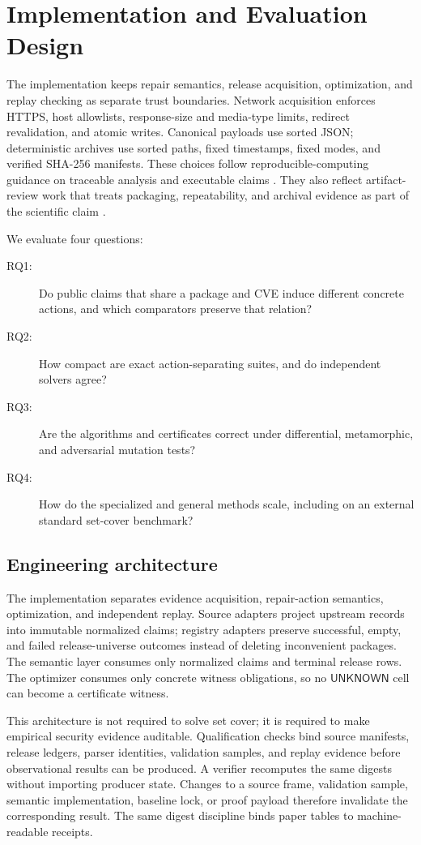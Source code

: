 \documentclass[10pt,conference]{IEEEtran}
\newcommand{\unknown}{\ensuremath{\mathsf{UNKNOWN}}}
\begin{document}
\section{Implementation and Evaluation Design}
The implementation keeps repair semantics, release acquisition, optimization, and replay checking as separate trust boundaries. Network acquisition enforces HTTPS, host allowlists, response-size and media-type limits, redirect revalidation, and atomic writes. Canonical payloads use sorted JSON; deterministic archives use sorted paths, fixed timestamps, fixed modes, and verified SHA-256 manifests. These choices follow reproducible-computing guidance on traceable analysis and executable claims \cite{peng2011reproducible,sandve2013ten,wilson2014best}. They also reflect artifact-review work that treats packaging, repeatability, and archival evidence as part of the scientific claim \cite{collberg2016repeatability,krishnamurthi2015artifact,ferro2018badging}.

We evaluate four questions:
\begin{description}
\item[RQ1:] Do public claims that share a package and CVE induce different concrete actions, and which comparators preserve that relation?
\item[RQ2:] How compact are exact action-separating suites, and do independent solvers agree?
\item[RQ3:] Are the algorithms and certificates correct under differential, metamorphic, and adversarial mutation tests?
\item[RQ4:] How do the specialized and general methods scale, including on an external standard set-cover benchmark?
\end{description}


\subsection{Engineering architecture}
The implementation separates evidence acquisition, repair-action semantics, optimization, and independent replay. Source adapters project upstream records into immutable normalized claims; registry adapters preserve successful, empty, and failed release-universe outcomes instead of deleting inconvenient packages. The semantic layer consumes only normalized claims and terminal release rows. The optimizer consumes only concrete witness obligations, so no \unknown{} cell can become a certificate witness.

This architecture is not required to solve set cover; it is required to make empirical security evidence auditable. Qualification checks bind source manifests, release ledgers, parser identities, validation samples, and replay evidence before observational results can be produced. A verifier recomputes the same digests without importing producer state. Changes to a source frame, validation sample, semantic implementation, baseline lock, or proof payload therefore invalidate the corresponding result. The same digest discipline binds paper tables to machine-readable receipts.
\end{document}
